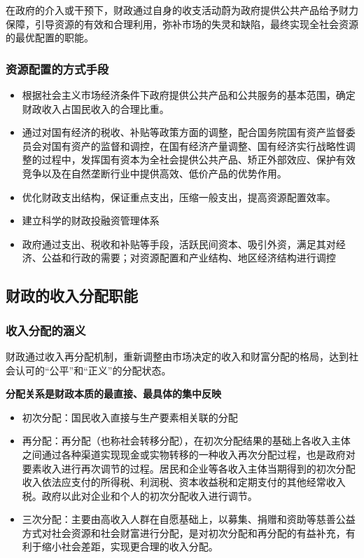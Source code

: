 \documentclass[
]{book}
\providecommand{\tightlist}{%
  \setlength{\itemsep}{0pt}\setlength{\parskip}{0pt}}
\begin{document}
在政府的介入或干预下，财政通过自身的收支活动蔚为政府提供公共产品给予财力保障，引导资源的有效和合理利用，弥补市场的失灵和缺陷，最终实现全社会资源的最优配置的职能。

\hypertarget{ux8d44ux6e90ux914dux7f6eux7684ux65b9ux5f0fux624bux6bb5}{%
\subsubsection{资源配置的方式手段}\label{ux8d44ux6e90ux914dux7f6eux7684ux65b9ux5f0fux624bux6bb5}}

\begin{itemize}
\tightlist
\item
  根据社会主义市场经济条件下政府提供公共产品和公共服务的基本范围，确定财政收入占国民收入的合理比重。
\item
  通过对国有经济的税收、补贴等政策方面的调整，配合国务院国有资产监督委员会对国有资产的监督和调控，在国有经济产量调整、国有经济实行战略性调整的过程中，发挥国有资本为全社会提供公共产品、矫正外部效应、保护有效竞争以及在自然垄断行业中提供高效、低价产品的优势作用。
\item
  优化财政支出结构，保证重点支出，压缩一般支出，提高资源配置效率。
\item
  建立科学的财政投融资管理体系
\item
  政府通过支出、税收和补贴等手段，活跃民间资本、吸引外资，满足其对经济、公益和行政的需要；对资源配置和产业结构、地区经济结构进行调控
\end{itemize}

\hypertarget{ux8d22ux653fux7684ux6536ux5165ux5206ux914dux804cux80fd}{%
\subsection{财政的收入分配职能}\label{ux8d22ux653fux7684ux6536ux5165ux5206ux914dux804cux80fd}}

\hypertarget{ux6536ux5165ux5206ux914dux7684ux6db5ux4e49}{%
\subsubsection{收入分配的涵义}\label{ux6536ux5165ux5206ux914dux7684ux6db5ux4e49}}

财政通过收入再分配机制，重新调整由市场决定的收入和财富分配的格局，达到社会认可的``公平''和``正义''的分配状态。

\textbf{分配关系是财政本质的最直接、最具体的集中反映}

\begin{itemize}
\tightlist
\item
  初次分配：国民收入直接与生产要素相关联的分配
\item
  再分配：再分配（也称社会转移分配），在初次分配结果的基础上各收入主体之间通过各种渠道实现现金或实物转移的一种收入再次分配过程，也是政府对要素收入进行再次调节的过程。居民和企业等各收入主体当期得到的初次分配收入依法应支付的所得税、利润税、资本收益税和定期支付的其他经常收入税。政府以此对企业和个人的初次分配收入进行调节。
\item
  三次分配：主要由高收入人群在自愿基础上，以募集、捐赠和资助等慈善公益方式对社会资源和社会财富进行分配，是对初次分配和再分配的有益补充，有利于缩小社会差距，实现更合理的收入分配。
\end{itemize}
\end{document}
